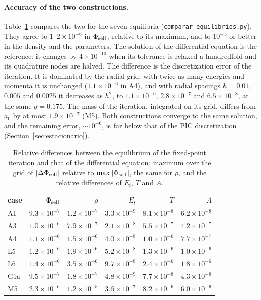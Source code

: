 \documentclass[11pt,a4paper]{article}
\begin{document}
\paragraph{Accuracy of the two constructions.} Table~\ref{tab:edo} compares the two for
the seven equilibria (\texttt{comparar\_\allowbreak equilibrios.py}). They agree to
$1$--$2\times10^{-6}$ in $\Phi_{\rm self}$, relative to its maximum, and to $10^{-5}$ or better in
the density and the parameters. The solution of the differential equation is the
reference: it changes by $4\times10^{-10}$ when its tolerance is relaxed a hundredfold and
its quadrature nodes are halved. The difference is the discretization error of the
iteration. It is dominated by the radial grid: with twice as many energies and momenta it
is unchanged ($1.1\times10^{-6}$ in A4), and with radial spacings $h=0.01$, $0.005$ and $0.0025$
it decreases as $h^2$, to $1.1\times10^{-6}$, $2.8\times10^{-7}$ and $6.5\times10^{-8}$, at the same
$q=0.175$. The mass of the iteration, integrated on its grid, differs from $a_0$ by at most
$1.9\times10^{-7}$ (M5). Both constructions converge to the same solution, and the
remaining error, $\sim10^{-6}$, is far below that of the PIC discretization
(Section~\ref{sec:estacionario}).

\begin{table}[!htbp]
\centering
\small
\begin{tabular}{lrrrrr}
\toprule
case & $\Phi_{\rm self}$ & $\rho$ & $E_t$ & $T$ & $A$\\
\midrule
A1 & $9.3\times10^{-7}$ & $1.2\times10^{-7}$ & $3.3\times10^{-9}$ & $8.1\times10^{-8}$ & $6.2\times10^{-8}$\\
A3 & $1.0\times10^{-6}$ & $7.9\times10^{-7}$ & $2.1\times10^{-8}$ & $5.5\times10^{-7}$ & $4.2\times10^{-7}$\\
A4 & $1.1\times10^{-6}$ & $1.5\times10^{-6}$ & $4.0\times10^{-8}$ & $1.0\times10^{-6}$ & $7.7\times10^{-7}$\\
L5 & $1.2\times10^{-6}$ & $1.9\times10^{-6}$ & $5.2\times10^{-8}$ & $1.3\times10^{-6}$ & $1.0\times10^{-6}$\\
L6 & $1.4\times10^{-6}$ & $3.5\times10^{-6}$ & $9.7\times10^{-8}$ & $2.4\times10^{-6}$ & $1.8\times10^{-6}$\\
G1a & $9.5\times10^{-7}$ & $1.8\times10^{-7}$ & $4.8\times10^{-9}$ & $7.7\times10^{-8}$ & $4.3\times10^{-8}$\\
M5 & $2.3\times10^{-6}$ & $1.2\times10^{-5}$ & $3.6\times10^{-7}$ & $8.2\times10^{-6}$ & $6.0\times10^{-6}$\\
\bottomrule
\end{tabular}
\caption{Relative differences between the equilibrium of the fixed-point iteration and
that of the differential equation: maximum over the grid of $|\Delta\Phi_{\rm self}|$ relative to
$\max|\Phi_{\rm self}|$, the same for $\rho$, and the relative differences of $E_t$, $T$ and $A$.}
\label{tab:edo}
\end{table}
\end{document}
